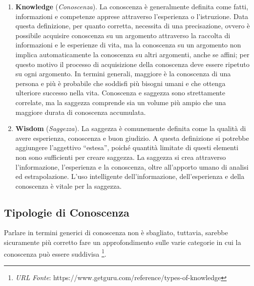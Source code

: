 \begin{enumerate}
    \item \textbf{Knowledge} (\textit{Conoscenza}). La conoscenza è generalmente definita come fatti, informazioni e competenze apprese attraverso l'esperienza o l'istruzione. Data questa definizione, per quanto corretta, necessita di una precisazione, ovvero è possibile acquisire conoscenza su un argomento attraverso la raccolta di informazioni e le esperienze di vita, ma la conoscenza su un argomento non implica automaticamente la conoscenza su altri argomenti, anche se affini; per questo motivo il processo di acquisizione della conoscenza deve essere ripetuto su ogni argomento. In termini generali, maggiore è la conoscenza di una persona e più è probabile che soddisfi più bisogni umani e che ottenga ulteriore successo nella vita. Conoscenza e saggezza sono strettamente correlate, ma la saggezza comprende sia un volume più ampio che una maggiore durata di conoscenza accumulata.
    \item \textbf{Wisdom} (\textit{Saggezza}). La saggezza è comunemente definita come la qualità di avere esperienza, conoscenza e buon giudizio. A questa definizione si potrebbe aggiungere l'aggettivo “estesa”, poiché quantità limitate di questi elementi non sono sufficienti per creare saggezza. La saggezza si crea attraverso l'informazione, l'esperienza e la conoscenza, oltre all'apporto umano di analisi ed estrapolazione. L'uso intelligente dell'informazione, dell'esperienza e della conoscenza è vitale per la saggezza.
\end{enumerate}

\subsection{Tipologie di Conoscenza}

Parlare in termini generici di conoscenza non è sbagliato, tuttavia, sarebbe sicuramente più corretto fare un approfondimento sulle varie categorie in cui la conoscenza può essere suddivisa \footnote{\textit{URL Fonte}: https://www.getguru.com/reference/types-of-knowledge}.

